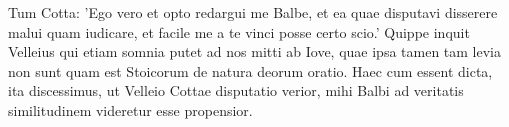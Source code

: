  Tum Cotta: 'Ego vero et opto redargui me Balbe, et ea quae disputavi disserere malui quam iudicare, et facile me a te vinci posse certo scio.' Quippe inquit Velleius qui etiam somnia putet ad nos mitti ab Iove, quae ipsa tamen tam levia non sunt quam est Stoicorum de natura deorum oratio. Haec cum essent dicta, ita discessimus, ut Velleio Cottae disputatio verior, mihi Balbi ad veritatis similitudinem videretur esse propensior.
